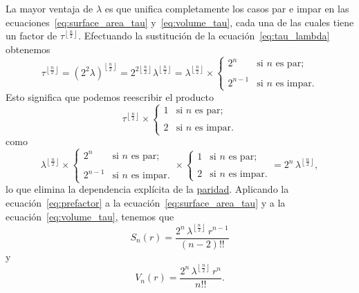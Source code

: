 La mayor ventaja de $\lambda$ es que unifica completamente los casos par e impar en las ecuaciones~\eqref{eq:surface_area_tau} y~\eqref{eq:volume_tau}, cada una de las cuales tiene un factor de $\tau^{\left\lfloor \frac{n}{2} \right\rfloor}$. Efectuando la sustitución de la ecuación~\eqref{eq:tau_lambda} obtenemos
\[
\tau^{\left\lfloor \frac{n}{2} \right\rfloor} = (2^2\lambda)^{\left\lfloor \frac{n}{2} \right\rfloor} = 2^{2\left\lfloor \frac{n}{2} \right\rfloor} \lambda^{\left\lfloor \frac{n}{2} \right\rfloor} =
\lambda^{\left\lfloor \frac{n}{2} \right\rfloor}\times
\begin{cases}
 2^n & \text{si } n \text{ es par}; \\ \\
 2^{n-1} & \text{si } n \text{ es impar}.
 \end{cases}
\]
Esto significa que podemos reescribir el producto
\[
\tau^{\left\lfloor \frac{n}{2} \right\rfloor}\times \begin{cases}
1 & \text{si } n \text{ es par}; \\ \\
2 & \text{si } n \text{ es impar}.
\end{cases}
\]
como
\begin{equation}
\label{eq:prefactor}
\lambda^{\left\lfloor \frac{n}{2} \right\rfloor} \times
\begin{cases}
 2^n & \text{si } n \text{ es par}; \\ \\
 2^{n-1} & \text{si } n \text{ es impar}.
 \end{cases}
  \times \begin{cases}
 1 & \text{si } n \text{ es par}; \\ \\
 2 & \text{si } n \text{ es impar}.
 \end{cases}
 = 2^n\,\lambda^{\left\lfloor \frac{n}{2} \right\rfloor},
\end{equation}
lo que elimina la dependencia explícita de la \href{https://es.wikipedia.org/wiki/Números_pares_e_impares}{paridad}. Aplicando la ecuación~\eqref{eq:prefactor} a la ecuación~\eqref{eq:surface_area_tau} y a la ecuación~\eqref{eq:volume_tau}, tenemos que
\begin{equation}
\label{eq:surface_area_lambda}
S_n(r) = \frac{2^n\,\lambda^{\left\lfloor \frac{n}{2} \right\rfloor}\,r^{n-1}}{(n-2)!!}
\end{equation}
y
\begin{equation}
\label{eq:volume_lambda}
V_n(r) = \frac{2^n\,\lambda^{\left\lfloor \frac{n}{2} \right\rfloor}\,r^n}{n!!}.
\end{equation}

